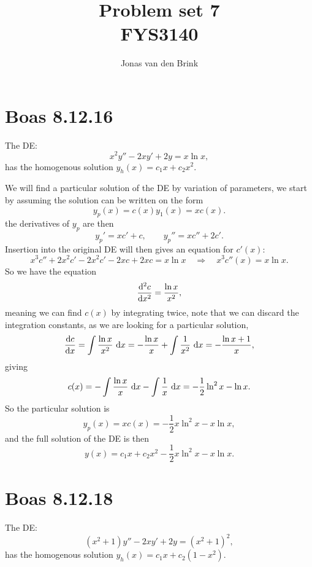 \documentclass[a4paper, 11pt, titlepage, english]{article}
\author{Jonas van den Brink}
\title{Problem set 7 \\ FYS3140}
\renewcommand{\d}{{\rm d}}
\newcommand{\To}{\quad\Rightarrow\quad}
\begin{document}
\maketitle
% 

\section*{Boas 8.12.16}
The DE:
$$x^2y'' - 2xy' + 2y = x\ln x,$$
has the homogenous solution $y_h(x) = c_1 x + c_2 x^2$. 

We will find a particular solution of the DE by variation of parameters, we start by assuming the solution can be written on the form
$$y_p(x) = c(x)y_1(x) = xc(x).$$
the derivatives of $y_p$ are then
$$ y_p' = xc' + c, \qquad y_p'' = xc'' + 2c'.$$
Insertion into the original DE will then gives an equation for $c'(x)$:
$$x^3c'' + 2x^2c' -2x^2c' -2xc + 2xc = x \ln x \To x^3c''(x) = x\ln x.$$
So we have the equation
$$\frac{\d^2 c}{\d x^2} = \frac{\ln x}{x^2},$$
meaning we can find $c(x)$ by integrating twice, note that we can discard the integration constants, as we are looking for a particular solution,
$$\frac{\d c}{\d x} = \int \frac{\ln x}{x^2} \ \d x = -\frac{\ln x}{x} + \int \frac{1}{x^2} \ \d x = -\frac{\ln x + 1}{x},$$
giving
$$c(x) = - \int \frac{\ln x}{x} \ \d x -\int\frac{1}{x}\ \d x = -\frac{1}{2}\ln^2 x - \ln x.$$
So the particular solution is
$$y_p(x) = xc(x) = -\frac{1}{2}x\ln^2 x - x\ln x,$$
and the full solution of the DE is then
$$y(x) = c_1 x + c_2 x^2  -\frac{1}{2}x\ln^2 x - x\ln x.$$

\clearpage

\section*{Boas 8.12.18}
The DE:
$$(x^2+1)y'' - 2xy' + 2y = (x^2+1)^2,$$
has the homogenous solution $y_h(x) = c_1 x + c_2 (1-x^2)$. 
\end{document}
